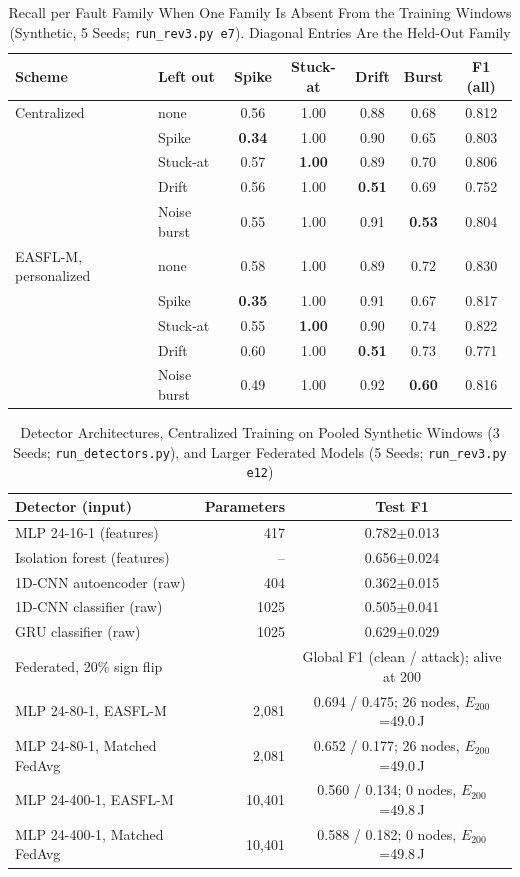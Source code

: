\documentclass[journal,onecolumn]{IEEEtran}
\begin{document}
\begin{table}[h]\caption{Recall per Fault Family When One Family Is Absent From the Training Windows (Synthetic, 5 Seeds; \texttt{run\_rev3.py e7}). Diagonal Entries Are the Held-Out Family}\centering\small
\begin{tabular}{@{}llccccc@{}}\toprule Scheme & Left out & Spike & Stuck-at & Drift & Burst & F1 (all)\\\midrule
Centralized & none & 0.56 & 1.00 & 0.88 & 0.68 & 0.812\\
 & Spike & \textbf{0.34} & 1.00 & 0.90 & 0.65 & 0.803\\
 & Stuck-at & 0.57 & \textbf{1.00} & 0.89 & 0.70 & 0.806\\
 & Drift & 0.56 & 1.00 & \textbf{0.51} & 0.69 & 0.752\\
 & Noise burst & 0.55 & 1.00 & 0.91 & \textbf{0.53} & 0.804\\
\midrule
EASFL-M, personalized & none & 0.58 & 1.00 & 0.89 & 0.72 & 0.830\\
 & Spike & \textbf{0.35} & 1.00 & 0.91 & 0.67 & 0.817\\
 & Stuck-at & 0.55 & \textbf{1.00} & 0.90 & 0.74 & 0.822\\
 & Drift & 0.60 & 1.00 & \textbf{0.51} & 0.73 & 0.771\\
 & Noise burst & 0.49 & 1.00 & 0.92 & \textbf{0.60} & 0.816\\

\bottomrule\end{tabular}\end{table}
\begin{table}[h]\caption{Detector Architectures, Centralized Training on Pooled Synthetic Windows (3 Seeds; \texttt{run\_detectors.py}), and Larger Federated Models (5 Seeds; \texttt{run\_rev3.py e12})}\centering\small
\begin{tabular}{@{}lrc@{}}\toprule Detector (input) & Parameters & Test F1\\\midrule
MLP 24-16-1 (features) & 417 & 0.782$\pm$0.013\\
Isolation forest (features) & -- & 0.656$\pm$0.024\\
1D-CNN autoencoder (raw) & 404 & 0.362$\pm$0.015\\
1D-CNN classifier (raw) & 1025 & 0.505$\pm$0.041\\
GRU classifier (raw) & 1025 & 0.629$\pm$0.029\\
\midrule Federated, 20\% sign flip & & Global F1 (clean / attack); alive at 200\\\midrule
MLP 24-80-1, EASFL-M & 2,081 & 0.694 / 0.475; 26 nodes, $E_{200}$=49.0\,J\\
MLP 24-80-1, Matched FedAvg & 2,081 & 0.652 / 0.177; 26 nodes, $E_{200}$=49.0\,J\\
MLP 24-400-1, EASFL-M & 10,401 & 0.560 / 0.134; 0 nodes, $E_{200}$=49.8\,J\\
MLP 24-400-1, Matched FedAvg & 10,401 & 0.588 / 0.182; 0 nodes, $E_{200}$=49.8\,J\\
\bottomrule\end{tabular}\end{table}
\end{document}
